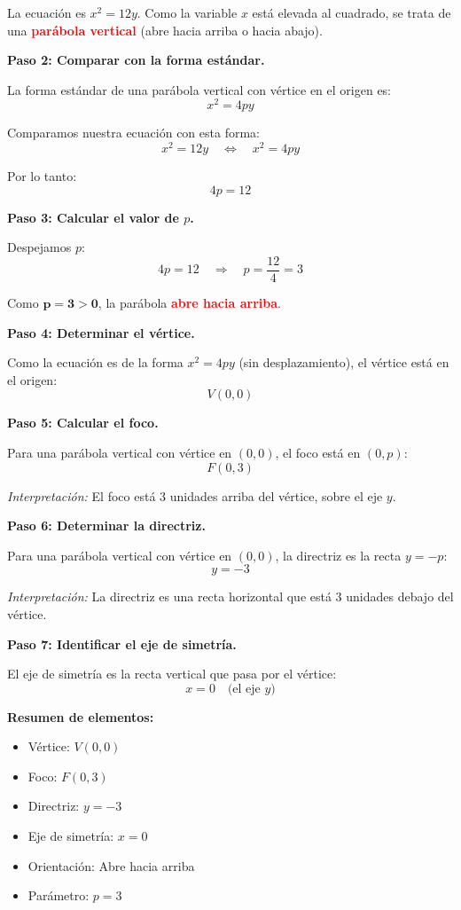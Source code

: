 \documentclass[12pt,a4paper]{article}
\begin{document}
	La ecuación es \(x^2=12y\). Como la variable \(x\) está elevada al cuadrado, se trata de una \textcolor{red}{\textbf{parábola vertical}} (abre hacia arriba o hacia abajo).

	\bigskip

	\textbf{Paso 2: Comparar con la forma estándar.}

	La forma estándar de una parábola vertical con vértice en el origen es:
	\[
	x^2=4py
	\]

	Comparamos nuestra ecuación con esta forma:
	\[
	x^2=12y \quad\Leftrightarrow\quad x^2=4py
	\]

	Por lo tanto:
	\[
	4p=12
	\]

	\textbf{Paso 3: Calcular el valor de \(p\).}

	Despejamos \(p\):
	\[
	4p=12 \quad\Rightarrow\quad p=\frac{12}{4}=3
	\]

	Como \(\mathbf{p=3>0}\), la parábola \textcolor{red}{\textbf{abre hacia arriba}}.

	\bigskip

	\textbf{Paso 4: Determinar el vértice.}

	Como la ecuación es de la forma \(x^2=4py\) (sin desplazamiento), el vértice está en el origen:
	\[
	\boxed{V(0,0)}
	\]

	\textbf{Paso 5: Calcular el foco.}

	Para una parábola vertical con vértice en \((0,0)\), el foco está en \((0,p)\):
	\[
	\boxed{F(0,3)}
	\]

	\emph{Interpretación:} El foco está 3 unidades arriba del vértice, sobre el eje \(y\).

	\bigskip

	\textbf{Paso 6: Determinar la directriz.}

	Para una parábola vertical con vértice en \((0,0)\), la directriz es la recta \(y=-p\):
	\[
	\boxed{y=-3}
	\]

	\emph{Interpretación:} La directriz es una recta horizontal que está 3 unidades debajo del vértice.

	\bigskip

	\textbf{Paso 7: Identificar el eje de simetría.}

	El eje de simetría es la recta vertical que pasa por el vértice:
	\[
	x=0 \quad\text{(el eje \(y\))}
	\]

	\bigskip

	\textbf{Resumen de elementos:}
	\begin{itemize}
		\item Vértice: \(V(0,0)\)
		\item Foco: \(F(0,3)\)
		\item Directriz: \(y=-3\)
		\item Eje de simetría: \(x=0\)
		\item Orientación: Abre hacia arriba
		\item Parámetro: \(p=3\)
	\end{itemize}
\end{document}
